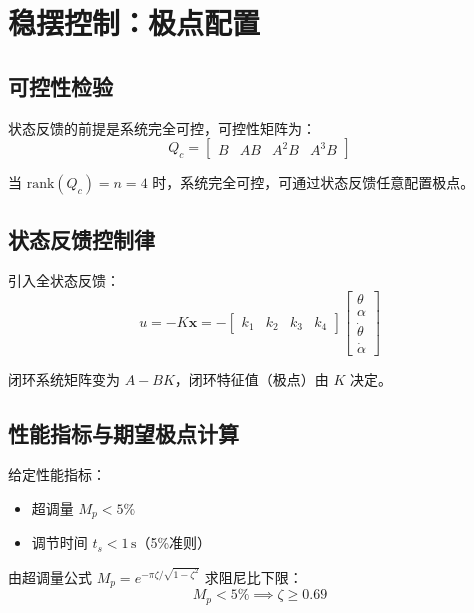 \documentclass[12pt, a4paper]{article}
\begin{document}
\section{稳摆控制：极点配置}

\subsection{可控性检验}

状态反馈的前提是系统完全可控，可控性矩阵为：
\begin{equation}
    Q_c = \begin{bmatrix} B & AB & A^2B & A^3B \end{bmatrix}
\end{equation}

当 $\text{rank}(Q_c) = n = 4$ 时，系统完全可控，可通过状态反馈任意配置极点。

\subsection{状态反馈控制律}

引入全状态反馈：
\begin{equation}
    u = -K\bm{x} = -\begin{bmatrix} k_1 & k_2 & k_3 & k_4 \end{bmatrix}
    \begin{bmatrix} \theta \\ \alpha \\ \dot{\theta} \\ \dot{\alpha} \end{bmatrix}
\end{equation}

闭环系统矩阵变为 $A - BK$，闭环特征值（极点）由 $K$ 决定。

\subsection{性能指标与期望极点计算}

给定性能指标：
\begin{itemize}
    \item 超调量 $M_p < 5\%$
    \item 调节时间 $t_s < 1\,\text{s}$（5\%准则）
\end{itemize}

由超调量公式 $M_p = e^{-\pi\zeta/\sqrt{1-\zeta^2}}$ 求阻尼比下限：
\begin{equation}
    M_p < 5\% \implies \zeta \geq 0.69
\end{equation}
\end{document}
